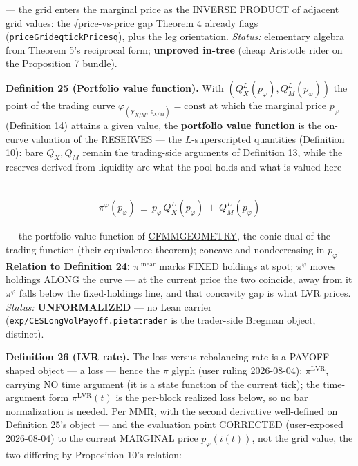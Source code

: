 \documentclass[11pt]{article}
\renewcommand{\_}{\textunderscore\allowbreak}
\begin{document}
--- the grid enters the marginal price as the INVERSE PRODUCT of adjacent grid values: the √price-vs-price gap Theorem 4 already flags (\texttt{priceGrid\_eq\_tickPrice\_sq}), plus the leg orientation. \emph{Status:} elementary algebra from Theorem 5's reciprocal form; \textbf{unproved in-tree} (cheap Aristotle rider on the Proposition 7 bundle).

\textbf{Definition 25 (Portfolio value function).} With \((Q_X^L(p_{\varphi}), Q_M^L(p_{\varphi}))\) the point of the trading curve \(\varphi_{(\chi_{X/M},\,\epsilon_{X/M})} = \text{const}\) at which the marginal price \(p_{\varphi}\) (Definition 14) attains a given value, the \textbf{portfolio value function} is the on-curve valuation of the RESERVES --- the \(L\)-superscripted quantities (Definition 10): bare \(Q_X, Q_M\) remain the trading-side arguments of Definition 13, while the reserves derived from liquidity are what the pool holds and what is valued here ---

\[
    \begin{aligned}
        \pi^{\varphi}(p_{\varphi}) \, \equiv \, p_{\varphi}\, Q_X^L(p_{\varphi}) \, + \, Q_M^L(p_{\varphi})
    \end{aligned}
\]

--- the portfolio value function of \href{../refs/cfmm/angeris-geometry_of_cfmms-2023.pdf}{CFMM\_GEOMETRY}, the conic dual of the trading function (their equivalence theorem); concave and nondecreasing in \(p_{\varphi}\). \textbf{Relation to Definition 24:} \(\pi^{\text{linear}}\) marks FIXED holdings at spot; \(\pi^{\varphi}\) moves holdings ALONG the curve --- at the current price the two coincide, away from it \(\pi^{\varphi}\) falls below the fixed-holdings line, and that concavity gap is what LVR prices. \emph{Status:} \textbf{UNFORMALIZED} --- no Lean carrier (\texttt{exp/CESLongVolPayoff.pi\_eta\_trader} is the trader-side Bregman object, distinct).

\textbf{Definition 26 (LVR rate).} The loss-versus-rebalancing rate is a PAYOFF-shaped object --- a loss --- hence the \(\pi\) glyph (user ruling 2026-08-04): \(\pi^{\mathrm{LVR}}\), carrying NO time argument (it is a state function of the current tick); the time-argument form \(\pi^{\mathrm{LVR}}(t)\) is the per-block realized loss below, so no bar normalization is needed. Per \href{../refs/mev/MilionisMoallemiRoughgardenArbProfitsFees.pdf}{MMR}, with the second derivative well-defined on Definition 25's object --- and the evaluation point CORRECTED (user-exposed 2026-08-04) to the current MARGINAL price \(p_{\varphi}(i(t))\), not the grid value, the two differing by Proposition 10's relation:
\end{document}
